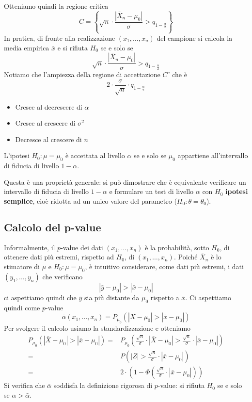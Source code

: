 Otteniamo quindi la regione critica
\[
	C = \left\{ \sqrt{n} \cdot \frac{|\bar{X}_n -
		\mu_0|}{\sigma} > q_{1 - \frac{\alpha}{2}} \right\}
\]
In pratica, di fronte alla realizzazione $(x_1, \dots, x_n)$ del campione si calcola la media
empirica $\bar{x}$ e si rifiuta $H_0$ se e solo se
\[ \sqrt{n} \cdot \frac{|\bar{X}_n - \mu_0|}{\sigma} > q_{1 - \frac{\alpha}{2}}  \]
Notiamo che l'ampiezza della regione di accettazione $C^c$ che è
\[ 2 \cdot \frac{\sigma}{\sqrt{n}} \cdot q_{1 - \frac{\alpha}{2}} \]
\begin{itemize}
	\item Cresce al decrescere di $\alpha$
	\item Cresce al crescere di $\sigma^2$
	\item Decresce al crescere di $n$
\end{itemize}

\begin{observation}
	L'ipotesi $H_0: \mu = \mu_0$ è accettata al livello $\alpha$ se e solo se $\mu_0$ appartiene
	all'intervallo di fiducia di livello $1-\alpha$.
\end{observation}

Questa è una proprietà generale: si può dimostrare che è equivalente verificare un intervallo di
fiducia di livello $1-\alpha$ e formulare un test di livello $\alpha$ con $H_0$
\textbf{ipotesi semplice}, cioè ridotta ad un unico valore del parametro
($H_0 : \theta = \theta_0$).

\subsection{Calcolo del p-value}
Informalmente, il $p$-value dei dati $(x_1, \dots, x_n)$ è la probabilità, sotto $H_0$, di
ottenere dati più estremi, rispetto ad $H_0$, di $(x_1, \dots, x_n)$. Poiché $\bar{X}_n$ è
lo stimatore di $\mu$ e $H_0: \mu = \mu_0$, è intuitivo considerare, come dati più estremi, i dati
$(y_1, \dots, y_n)$ che verificano
\[ |\bar{y} - \mu_0| > |\bar{x} - \mu_0| \]
ci aspettiamo quindi che $\bar{y}$ sia più distante da $\mu_0$ rispetto a $\bar{x}$. Ci
aspettiamo quindi come $p$-value
\[
	\bar{\alpha} (x_1, \dots, x_n) =
	P_{\mu_0} (|\bar{X} - \mu_0| > |\bar{x} - \mu_0|)
\]
Per svolgere il calcolo usiamo la standardizzazione e otteniamo
\begin{align*}
	P_{\mu_0} (|\bar{X} - \mu_0| > |\bar{x} - \mu_0|)
	= & P_{\mu_0} \left( \frac{\sqrt{n}}{\sigma} \cdot |\bar{X} - \mu_0| >
	\frac{\sqrt{n}}{\sigma} \cdot |\bar{x} - \mu_0| \right)                    \\
	= & P \left( |Z| > \frac{\sqrt{n}}{\sigma} \cdot |\bar{x} - \mu_0| \right) \\
	= & 2 \cdot \left(1 - \Phi \left(\frac{\sqrt{n}}{\sigma} \cdot
		|\bar{x} - \mu_0| \right) \right)
\end{align*}
Si verifica che $\bar{\alpha}$ soddisfa la definizione rigorosa di $p$-value: si rifiuta $H_0$
se e solo se $\alpha > \bar{\alpha}$.


